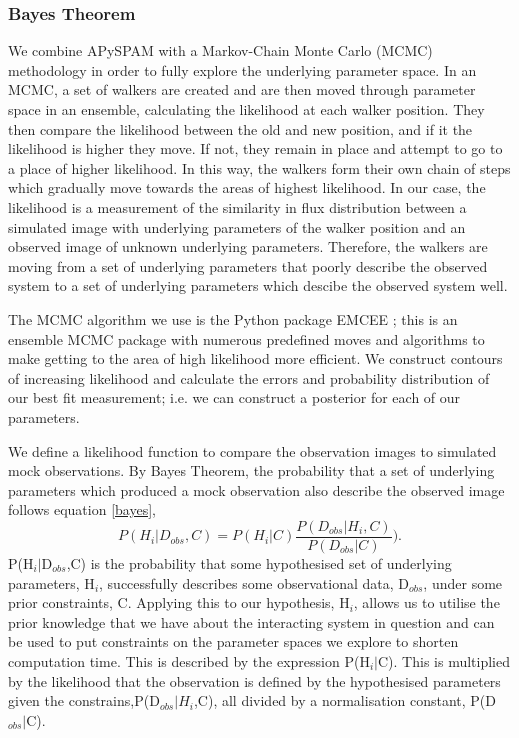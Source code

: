 \subsubsection{Bayes Theorem}
We combine APySPAM with a Markov-Chain Monte Carlo (MCMC) methodology in order to fully explore the underlying parameter space. In an MCMC, a set of walkers are created and are then moved through parameter space in an ensemble, calculating the likelihood at each walker position. They then compare the likelihood between the old and new position, and if it the likelihood is higher they move. If not, they remain in place and attempt to go to a place of higher likelihood. In this way, the walkers form their own chain of steps which gradually move towards the areas of highest likelihood. In our case, the likelihood is a measurement of the similarity in flux distribution between a simulated image with underlying parameters of the walker position and an observed image of unknown underlying parameters. Therefore, the walkers are moving from a set of underlying parameters that poorly describe the observed system to a set of underlying parameters which descibe the observed system well. 

The MCMC algorithm we use is the Python package EMCEE \citep{2013PASP..125..306F}; this is an ensemble MCMC package with numerous predefined moves and algorithms to make getting to the area of high likelihood more efficient. We construct contours of increasing likelihood and calculate the errors and probability distribution of our best fit measurement; i.e. we can construct a posterior for each of our parameters.

We define a likelihood function to compare the observation images to simulated mock observations. By Bayes Theorem, the probability that a set of underlying parameters which produced a mock observation also describe the observed image follows equation \ref{bayes},
\begin{equation}\label{bayes}
    P(H_{i}|D_{obs},C) = P(H_{i}|C)\frac{P(D_{obs}|H_{i},C)}{P(D_{obs}|C)}).
\end{equation}
P(H$_{i}|$D$_{obs}$,C) is the probability that some hypothesised set of underlying parameters, H$_{i}$, successfully describes some observational data, D$_{obs}$, under some prior constraints, C. Applying this to our hypothesis, H$_{i}$, allows us to utilise the prior knowledge that we have about the interacting system in question and can be used to put constraints on the parameter spaces we explore to shorten computation time. This is described by the expression P(H$_{i}|$C). This is multiplied by the likelihood that the observation is defined by the hypothesised parameters given the constrains,P(D$_{obs}|$$H_{i}$,C), all divided by a normalisation constant, P(D$_{obs}|$C).

